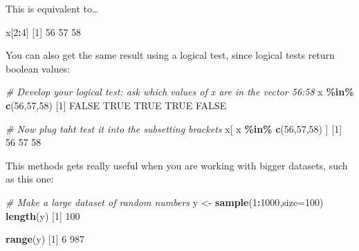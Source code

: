 \documentclass[
]{book}
\newenvironment{Shaded}{\begin{snugshade}}{\end{snugshade}}
\newcommand{\AttributeTok}[1]{\textcolor[rgb]{0.13,0.29,0.53}{#1}}
\newcommand{\CommentTok}[1]{\textcolor[rgb]{0.56,0.35,0.01}{\textit{#1}}}
\newcommand{\ConstantTok}[1]{\textcolor[rgb]{0.56,0.35,0.01}{#1}}
\newcommand{\DecValTok}[1]{\textcolor[rgb]{0.00,0.00,0.81}{#1}}
\newcommand{\FunctionTok}[1]{\textcolor[rgb]{0.13,0.29,0.53}{\textbf{#1}}}
\newcommand{\NormalTok}[1]{#1}
\newcommand{\OtherTok}[1]{\textcolor[rgb]{0.56,0.35,0.01}{#1}}
\newcommand{\SpecialCharTok}[1]{\textcolor[rgb]{0.81,0.36,0.00}{\textbf{#1}}}
\begin{document}
This is equivalent to\ldots{}

\begin{Shaded}
\begin{Highlighting}[]
\NormalTok{x[}\DecValTok{2}\SpecialCharTok{:}\DecValTok{4}\NormalTok{]}
\NormalTok{[}\DecValTok{1}\NormalTok{] }\DecValTok{56} \DecValTok{57} \DecValTok{58}
\end{Highlighting}
\end{Shaded}

You can also get the same result using a logical test, since logical tests return boolean values:

\begin{Shaded}
\begin{Highlighting}[]
\CommentTok{\# Develop your logical test: ask which values of x are in the vector 56:58}
\NormalTok{x }\SpecialCharTok{\%in\%} \FunctionTok{c}\NormalTok{(}\DecValTok{56}\NormalTok{,}\DecValTok{57}\NormalTok{,}\DecValTok{58}\NormalTok{)}
\NormalTok{[}\DecValTok{1}\NormalTok{] }\ConstantTok{FALSE}  \ConstantTok{TRUE}  \ConstantTok{TRUE}  \ConstantTok{TRUE} \ConstantTok{FALSE}

\CommentTok{\# Now plug taht test it into the subsetting brackets}
\NormalTok{x[ x }\SpecialCharTok{\%in\%} \FunctionTok{c}\NormalTok{(}\DecValTok{56}\NormalTok{,}\DecValTok{57}\NormalTok{,}\DecValTok{58}\NormalTok{) ]}
\NormalTok{[}\DecValTok{1}\NormalTok{] }\DecValTok{56} \DecValTok{57} \DecValTok{58}
\end{Highlighting}
\end{Shaded}

This methods gets really useful when you are working with bigger datasets, such as this one:

\begin{Shaded}
\begin{Highlighting}[]
\CommentTok{\# Make a large dataset of random numbers}
\NormalTok{y }\OtherTok{\textless{}{-}} \FunctionTok{sample}\NormalTok{(}\DecValTok{1}\SpecialCharTok{:}\DecValTok{1000}\NormalTok{,}\AttributeTok{size=}\DecValTok{100}\NormalTok{)}
\FunctionTok{length}\NormalTok{(y)}
\NormalTok{[}\DecValTok{1}\NormalTok{] }\DecValTok{100}
\end{Highlighting}
\end{Shaded}

\begin{Shaded}
\begin{Highlighting}[]
\FunctionTok{range}\NormalTok{(y)}
\NormalTok{[}\DecValTok{1}\NormalTok{]   }\DecValTok{6} \DecValTok{987}
\end{Highlighting}
\end{Shaded}
\end{document}
